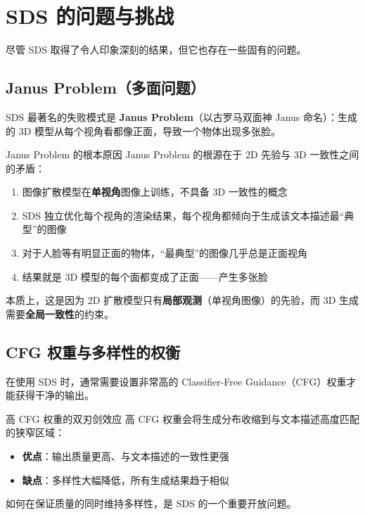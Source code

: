\section{SDS 的问题与挑战}

尽管 SDS 取得了令人印象深刻的结果，但它也存在一些固有的问题。

\subsection{Janus Problem（多面问题）}

SDS 最著名的失败模式是 \textbf{Janus Problem}（以古罗马双面神 Janus 命名）：生成的 3D 模型从每个视角看都像正面，导致一个物体出现多张脸。

\begin{warningbox}{Janus Problem 的根本原因}
Janus Problem 的根源在于 2D 先验与 3D 一致性之间的矛盾：

\begin{enumerate}
    \item 图像扩散模型在\textbf{单视角}图像上训练，不具备 3D 一致性的概念
    \item SDS 独立优化每个视角的渲染结果，每个视角都倾向于生成该文本描述最``典型''的图像
    \item 对于人脸等有明显正面的物体，``最典型''的图像几乎总是正面视角
    \item 结果就是 3D 模型的每个面都变成了正面——产生多张脸
\end{enumerate}

本质上，这是因为 2D 扩散模型只有\textbf{局部观测}（单视角图像）的先验，而 3D 生成需要\textbf{全局一致性}的约束。
\end{warningbox}

\subsection{CFG 权重与多样性的权衡}

在使用 SDS 时，通常需要设置非常高的 Classifier-Free Guidance（CFG）权重才能获得干净的输出。

\begin{knowledgebox}{高 CFG 权重的双刃剑效应}
高 CFG 权重会将生成分布收缩到与文本描述高度匹配的狭窄区域：

\begin{itemize}
    \item \textbf{优点}：输出质量更高、与文本描述的一致性更强
    \item \textbf{缺点}：多样性大幅降低，所有生成结果趋于相似
\end{itemize}

如何在保证质量的同时维持多样性，是 SDS 的一个重要开放问题。
\end{knowledgebox}

